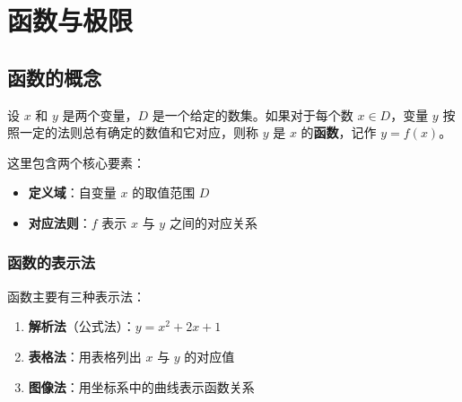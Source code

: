 \documentclass{harryopo-mathnotes}
\date{2026 年 6 月 21 日}
\begin{document}
\maketitle
\thispagestyle{empty}
\cleardoublepage

\setcounter{tocdepth}{2}
\tableofcontents
\cleardoublepage

\strictpagecheck
\setcounter{page}{1}
\restoregeometry
\onehalfspacing

\section{函数与极限}\label{ux51fdux6570ux4e0eux6781ux9650}

\subsection{函数的概念}\label{ux51fdux6570ux7684ux6982ux5ff5}

设 \(x\) 和 \(y\) 是两个变量，\(D\) 是一个给定的数集。如果对于每个数
\(x \in D\)，变量 \(y\) 按照一定的法则总有确定的数值和它对应，则称 \(y\)
是 \(x\) 的\textbf{函数}，记作 \(y = f(x)\)。

这里包含两个核心要素：

\begin{itemize}
\tightlist
\item
  \textbf{定义域}：自变量 \(x\) 的取值范围 \(D\)
\item
  \textbf{对应法则}：\(f\) 表示 \(x\) 与 \(y\) 之间的对应关系
\end{itemize}

\subsubsection{函数的表示法}\label{ux51fdux6570ux7684ux8868ux793aux6cd5}

函数主要有三种表示法：

\begin{enumerate}
\def\labelenumi{\arabic{enumi}.}
\tightlist
\item
  \textbf{解析法}（公式法）：\(y = x^2 + 2x + 1\)
\item
  \textbf{表格法}：用表格列出 \(x\) 与 \(y\) 的对应值
\item
  \textbf{图像法}：用坐标系中的曲线表示函数关系
\end{enumerate}
\end{document}
